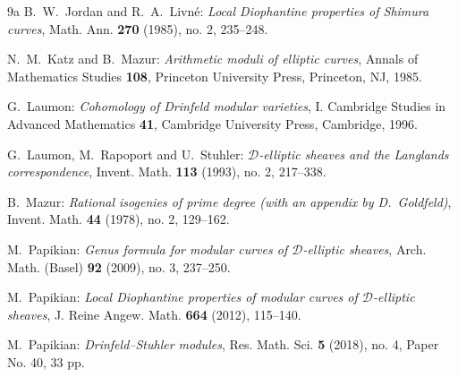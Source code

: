 \documentclass[10pt]{amsart}
\theoremstyle{plain}
\theoremstyle{definition}
\newcommand{\sD}{\mathscr{D}}
\begin{document}
\begin{thebibliography}{9a}
B.~W.~Jordan and R.~A.~Livn\'{e}:
\emph{Local Diophantine properties of Shimura curves},
Math. Ann. \textbf{270} (1985), no. 2, 235--248. 

N.~M.~Katz and B.~Mazur: \emph{Arithmetic moduli of elliptic curves}, Annals of Mathematics Studies \textbf{108}, Princeton University Press, Princeton, NJ, 
1985.


G.~Laumon:
\emph{Cohomology of Drinfeld modular varieties}, I. Cambridge Studies in Advanced Mathematics \textbf{41}, 
Cambridge University Press, Cambridge, 1996.

G.~Laumon, M.~Rapoport and U.~Stuhler: 
\emph{$\mathscr{D}$-elliptic sheaves and the Langlands correspondence},
Invent. Math. \textbf{113} (1993), no. 2, 217--338. 



B.~Mazur:
\emph{Rational isogenies of prime degree (with an appendix by D.~Goldfeld)},
Invent. Math. \textbf{44} (1978), no. 2, 129--162.


M.~Papikian:
\emph{Genus formula for modular curves of $\sD$-elliptic sheaves},
Arch. Math. (Basel) \textbf{92} (2009), no. 3, 237--250. 

M.~Papikian:
\emph{Local Diophantine properties of modular curves of $\sD$-elliptic sheaves},
J. Reine Angew. Math. \textbf{664} (2012), 115--140. 

M.~Papikian:
\emph{Drinfeld--Stuhler modules}, Res. Math. Sci. \textbf{5} (2018), no. 4, Paper No. 40, 33 pp.



\end{thebibliography}
\end{document}
